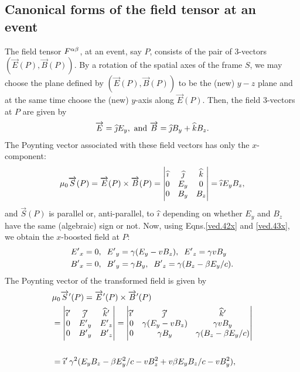 \subsection{Canonical forms of the field tensor at    
an\\  event}
The field tensor $F^{{\alpha}{\beta}}$, at an event, say $P$, 
consists of the pair of 3-vectors  
$(\vec{E}(P),\vec{B}(P))$. By a rotation of the spatial 
axes of the frame $S$, we may choose the plane defined 
by $(\vec{E}(P),\vec{B}(P))$ to be the (new) $y-z$ 
plane and at the same time choose the (new) $ y $-axis 
along $\vec{E}(P)$. Then, the field 3-vectors at $P$ 
are given by
\begin{align}\label{ved.46x}
\overrightarrow{E}={\widehat{\jmath}} E_y, \text{ and }\overrightarrow{B}={\widehat{\jmath}} B_y+{\widehat{k}} B_z.
\end{align}
The Poynting vector associated with these field vectors has
only the $x$-component:
\begin{align}\label{ved.47x}
 \mu_0 \overrightarrow{S}(P)=
\overrightarrow{E}(P)\times \overrightarrow{B}(P) 
=\begin{vmatrix} {\ensuremath{\widehat{\imath}}}&{\widehat{\jmath}}&{\widehat{k}}\\
0&E_y&0\\ 0&B_y&B_z   
\end{vmatrix}={\widehat{\imath}} E_yB_z,
\end{align}
and $\vec{S}(P)$ is parallel or, anti-parallel, to ${\widehat{\imath}}$ 
depending on whether $E_y$ and $B_z$ have the same 
(algebraic) sign or not. Now, using Eqns.\eqref{ved.42x} and
\eqref{ved.43x}, we obtain the  $x$-boosted field at $P$:
\begin{align}\label{ved.49x}
{\ensuremath{E'}}_x &= 0,\;\;{E'}_y ={\gamma}(E_y-v B_z),
\;\;{E'}_z =\gamma v B_y\\\label{ved.50x}
{\ensuremath{B'}}_x &= 0,\;\;{B'}_y =\gamma B_y,
\;\;{B'}_z =\gamma(B_z-{\beta} E_y/c ).
\end{align}
The Poynting vector of the transformed field is given by
\begin{align}\label{ved.51x}
&\mu_0 \overrightarrow{S}'(P) =
\overrightarrow{E}'(P)\times \overrightarrow{B}'(P) \notag\\
&=\begin{vmatrix} 
{\ensuremath{\widehat{\imath}}}'&{\widehat{\jmath}}'&{\widehat{k}}'\\
0&{E'}_y&{E'}_z\\ 0&{B'}_y&{B'}_z   
\end{vmatrix}=\begin{vmatrix}
{\ensuremath{\widehat{\imath}}}'&{\widehat{\jmath}}'&{\widehat{k}}'\\ 0&{\gamma}(E_y-v B_z)&{\gamma} v B_y\\ 0
&\gamma B_y&\gamma(B_z-{\beta} E_y/c) 
\end{vmatrix}\notag\\\notag\\
& ={\widehat{\imath}}' \,\gamma^2(E_yB_z-{\beta} E_y^2/c - v B_z^2
+v{\beta} E_y B_z/c-vB_y^2 ),
\end{align}
